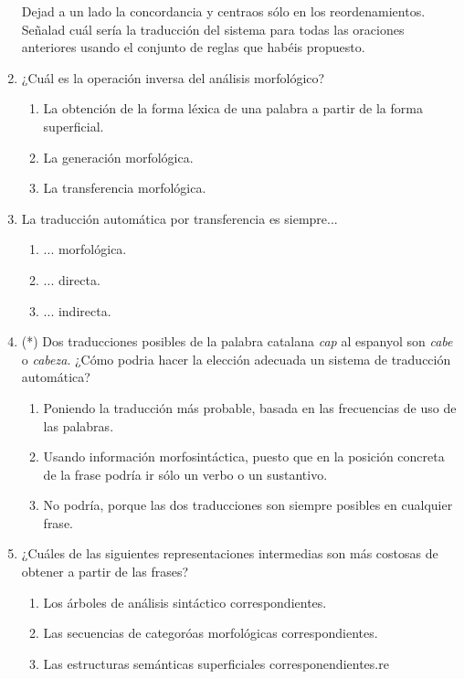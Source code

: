\begin{enumerate}
Dejad a un lado la concordancia y centraos sólo en los reordenamientos. Señalad cuál sería la traducción del sistema para todas las oraciones anteriores usando el conjunto de reglas que habéis propuesto. 

\item ¿Cuál es la operación inversa del análisis morfológico? \begin{enumerate} \item La obtención de la forma léxica de una palabra a partir de la forma superficial. \item La generación morfológica. \item La transferencia morfológica. \end{enumerate} 

\item La traducción automática por transferencia es siempre... \begin{enumerate} \item ... morfológica. \item ... directa. \item ... indirecta. \end{enumerate} 

\item (*) Dos traducciones posibles de la palabra catalana \emph{cap} al espanyol son \emph{cabe} o \emph{cabeza}. ¿Cómo podria hacer la elección adecuada un sistema de traducción automática? \begin{enumerate} \item Poniendo la traducción más probable, basada en las frecuencias de uso de las palabras. \item Usando información morfosintáctica, puesto que en la posición concreta de la frase podría ir sólo un verbo o un sustantivo. \item No podría, porque las dos traducciones son siempre posibles en cualquier frase. \end{enumerate} 

\item ¿Cuáles de las siguientes representaciones intermedias son más costosas de obtener a partir de las frases? \begin{enumerate} \item Los árboles de análisis sintáctico correspondientes. \item Las secuencias de categoróas morfológicas correspondientes. \item Las estructuras semánticas superficiales corresponendientes.re \end{enumerate} 


\end{enumerate}
